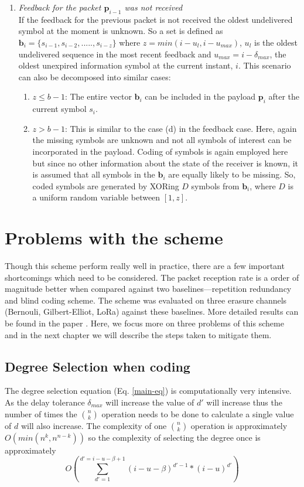 \begin{enumerate}
\begin{enumerate}
		\end{enumerate}
	\item \textit{Feedback for the packet $\mathbf{p}_{i-1}$ was  not received}\\
	If the feedback for the previous packet is not received the oldest undelivered symbol at the moment is unknown. So a set is defined as $\mathbf{b}_i = \{s_{i-1}, s_{i-2},.....,s_{i-z}\}$ where $z = min(i-u_l, i-u_{max})$, $u_l$ is the oldest undelivered sequence in the most recent feedback and $u_{max} = i-\delta_{max}$, the oldest unexpired information symbol at the current instant, $i$. This scenario can also be decomposed into similar cases:
	\begin{enumerate}
		\item $z \leq b-1$: The entire vector $\mathbf{b}_i$ can be included in the payload $\mathbf{p}_i$ after the current symbol $s_i$.
		\item $z > b-1$: This is similar to the case (d) in the feedback case. Here, again the missing symbols are unknown and not all symbols of interest can be incorporated in the payload. Coding of symbols is again employed here but since no other information about the state of the receiver is known, it is assumed that all symbols in the $\mathbf{b}_i$ are equally likely to be missing. So, coded symbols are generated by XORing $D$ symbols from $\mathbf{b}_i$, where $D$ is a uniform random variable between $[1, z]$.	
	\end{enumerate}
\end{enumerate}


\section{Problems with the scheme}
Though this scheme perform really well in practice, there are a few important shortcomings which need to be considered. The packet reception rate is a order of magnitude better when compared against two baselines---repetition redundancy and blind coding scheme. The scheme was evaluated on three erasure channels (Bernouli, Gilbert-Elliot, LoRa) against these baselines. More detailed results can be found in the paper \cite{borkotokyicc}. Here, we focus more on three problems of this scheme and in the next chapter we will describe the steps taken to mitigate them.

\subsection{Degree Selection when coding}
The degree selection equation (Eq. \ref{main-eq}) is computationally very intensive. As the delay tolerance $\delta_{max}$ will increase the value of $d'$ will increase thus the number of times the $\binom{n}{k}$ operation needs to be done to calculate a single value of $d$ will also increase. The complexity of one $\binom{n}{k}$ operation is approximately $O(min(n^k, n^{n-k}))$ so the complexity of selecting the degree once is approximately
\[
O\left(\sum \limits_{d'=1}^{d'=i-u-\beta +1}(i-u-\beta)^{d'-1} * (i-u)^{d'}\right)
\]

